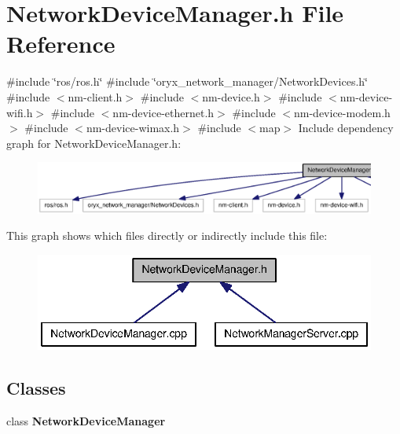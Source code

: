\section{\-Network\-Device\-Manager.\-h \-File \-Reference}
\label{NetworkDeviceManager_8h}
{\ttfamily \#include \char`\"{}ros/ros.\-h\char`\"{}}\*
{\ttfamily \#include \char`\"{}oryx\-\_\-network\-\_\-manager/\-Network\-Devices.\-h\char`\"{}}\*
{\ttfamily \#include $<$nm-\/client.\-h$>$}\*
{\ttfamily \#include $<$nm-\/device.\-h$>$}\*
{\ttfamily \#include $<$nm-\/device-\/wifi.\-h$>$}\*
{\ttfamily \#include $<$nm-\/device-\/ethernet.\-h$>$}\*
{\ttfamily \#include $<$nm-\/device-\/modem.\-h$>$}\*
{\ttfamily \#include $<$nm-\/device-\/wimax.\-h$>$}\*
{\ttfamily \#include $<$map$>$}\*
\-Include dependency graph for \-Network\-Device\-Manager.\-h\-:
\nopagebreak
\begin{figure}[H]
\begin{center}
\leavevmode
\includegraphics[width=350pt]{NetworkDeviceManager_8h__incl}
\end{center}
\end{figure}
\-This graph shows which files directly or indirectly include this file\-:
\nopagebreak
\begin{figure}[H]
\begin{center}
\leavevmode
\includegraphics[width=340pt]{NetworkDeviceManager_8h__dep__incl}
\end{center}
\end{figure}
\subsection*{\-Classes}
\begin{DoxyCompactItemize}
\item 
class {\bf \-Network\-Device\-Manager}
\end{DoxyCompactItemize}
